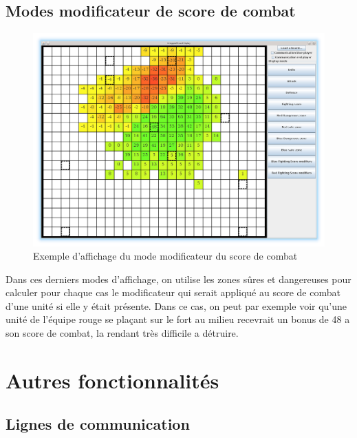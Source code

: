 			\clearpage

		\subsection{Modes modificateur de score de combat}
			\begin{figure}[!h]
				\centerline{\includegraphics[scale=0.4]{images/screen_fsmod.png}}
				\caption{Exemple d'affichage du mode modificateur du score de combat}
			\end{figure}
			Dans ces derniers modes d'affichage, on utilise les zones sûres et dangereuses pour calculer pour chaque cas le modificateur
			qui serait appliqué au score de combat d'une unité si elle y était présente.
			Dans ce cas, on peut par exemple voir qu'une unité de l'équipe rouge se plaçant sur le fort au milieu recevrait un bonus de 48 a son score de combat, la rendant très difficile a détruire.

	\section{Autres fonctionnalités}

		\subsection{Lignes de communication}

